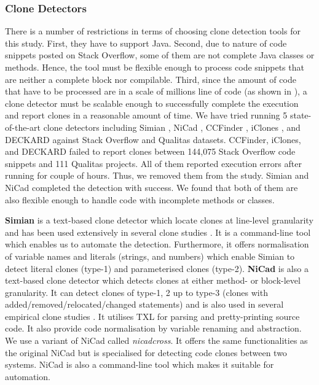 \documentclass{sig-alternate-05-2015}
\begin{document}
\subsubsection{Clone Detectors}
There is a number of restrictions in terms of choosing clone detection tools for this study. First, they have to support Java. Second, due to nature of code snippets posted on Stack Overflow, some of them are not complete Java classes or methods. Hence, the tool must be flexible enough to process code snippets that are neither a complete block nor compilable. Third, since the amount of code that have to be processed are in a scale of millions line of code (as shown in ), a clone detector must be scalable enough to successfully complete the execution and report clones in a reasonable amount of time. We have tried running 5 state-of-the-art clone detectors including Simian \cite{simian}, NiCad \cite{Cordy,Roy2008}, CCFinder \cite{Kamiya2002}, iClones \cite{Gode2009}, and DECKARD \cite{Jiang2007a} against Stack Overflow and Qualitas datasets. CCFinder, iClones, and DECKARD failed to report clones between 144,075 Stack Overflow code snippets and 111 Qualitas projects. All of them reported execution errors after running for couple of hours. Thus, we removed them from the study. Simian and NiCad completed the detection with success. We found that both of them are also flexible enough to handle code with incomplete methods or classes. %

\textbf{Simian} is a text-based clone detector which locate clones at line-level granularity and has been used extensively in several clone studies \cite{Ragkhitwetsagul2016, Wang2013, Mondal2011, Cheung2015, Krinke2010}. It is a command-line tool which enables us to automate the detection. Furthermore, it offers normalisation of variable names and literals (strings, and numbers) which enable Simian to detect literal clones (type-1) and parameterised clones (type-2). \textbf{NiCad} is also a text-based clone detector which detects clones at either method- or block-level granularity. It can detect clones of type-1, 2 up to type-3 (clones with added/removed/relocated/changed statements) and is also used in several empirical clone studies \cite{Roy2008, Ragkhitwetsagul2016, Svajlenko2014, Wang2013, Mondal2011, Sajnani2016}. It utilises TXL \cite{Cordy2006} for parsing and pretty-printing source code. It also provide code normalisation by variable renaming and abstraction. We use a variant of NiCad called \textit{nicadcross}. It offers the same functionalities as the original NiCad but is specialised for detecting code clones between two systems. NiCad is also a command-line tool which makes it suitable for automation.
\end{document}
